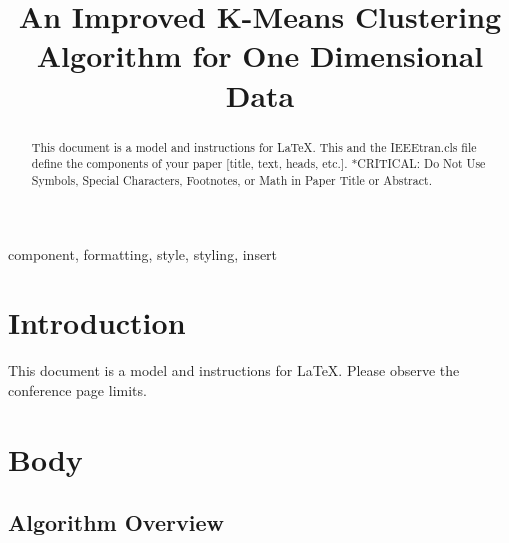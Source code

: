 \documentclass[conference]{IEEEtran}
\begin{document}
\title{An Improved K-Means Clustering Algorithm for One Dimensional Data}

\author{
\and
{}
\and
{}
}

\maketitle

\begin{abstract}
This document is a model and instructions for \LaTeX.
This and the IEEEtran.cls file define the components of your paper [title, text, heads, etc.]. *CRITICAL: Do Not Use Symbols, Special Characters, Footnotes, 
or Math in Paper Title or Abstract.
\end{abstract}

\begin{IEEEkeywords}
component, formatting, style, styling, insert
\end{IEEEkeywords}

\section{Introduction}
This document is a model and instructions for \LaTeX.
Please observe the conference page limits.

\section{Body}

\subsection{Algorithm Overview}
\end{document}
